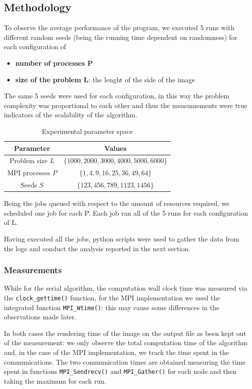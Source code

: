 \subsection{Methodology}
To observe the average performance of the program, we executed 5 runs with different random seeds (being the running time dependent on randomness) for each configuration of
\begin{itemize}
    \item \textbf{number of processes P}
    \item \textbf{size of the problem L}: the lenght of the side of the image
\end{itemize}
The same 5 seeds were used for each configuration, in this way the problem complexity was proportional to each other and thus the measumements were true indicators of the scalability of the algorithm.

\begin{table}[h!]
\centering
\begin{tabular}{|c|c|}
\hline
\textbf{Parameter} & \textbf{Values} \\
\hline
Problem size $L$ &
$\{1000, 2000, 3000, 4000, 5000, 6000\}$ \\
\hline
MPI processes $P$ &
$\{1, 4, 9, 16, 25, 36, 49, 64\}$ \\
\hline
Seeds $S$ &
$\{123, 456, 789, 1123, 1456\}$ \\
\hline
\end{tabular}
\caption{Experimental parameter space}
\end{table}

Being the jobs queued with respect to the amount of resources required, we scheduled one job for each P. Each job ran all of the 5 runs for each configuration of L.

Having executed all the jobs, python scripts were used to gather the data from the logs and conduct the analysis reported in the next section.

\subsubsection{Measurements}
While for the serial algorithm, the computation wall clock time was measured via the \texttt{clock\_gettime()} function, for the MPI implementation we used the integrated function \texttt{MPI\_Wtime()}: this may cause some differences in the observations made later.

In both cases the rendering time of the image on the output file as been kept out of the measurement: we only observe the total computation time of the algorithm and, in the case of the MPI implementation, we track the time spent in the communications.
The two communication times are obtained measuring the time spent in functions \texttt{MPI\_Sendrecv()} and \texttt{MPI\_Gather()} for each node and then taking the maximum for each run.

